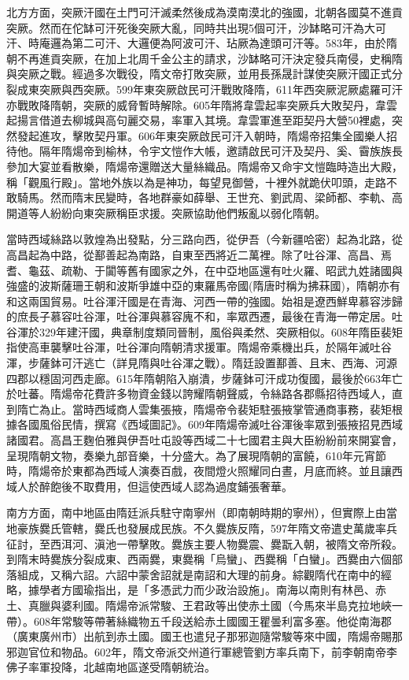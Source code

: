 北方方面，突厥汗國在土門可汗滅柔然後成為漠南漠北的強國，北朝各國莫不進貢突厥。然而在佗缽可汗死後突厥大亂，同時共出現5個可汗，沙缽略可汗為大可汗、時庵邏為第二可汗、大邏便為阿波可汗、玷厥為達頭可汗等。583年，由於隋朝不再進貢突厥，在加上北周千金公主的請求，沙缽略可汗決定發兵南侵，史稱隋與突厥之戰。經過多次戰役，隋文帝打敗突厥，並用長孫晟計謀使突厥汗國正式分裂成東突厥與西突厥。599年東突厥啟民可汗戰敗降隋，611年西突厥泥厥處羅可汗亦戰敗降隋朝，突厥的威脅暫時解除。605年隋將韋雲起率突厥兵大敗契丹，韋雲起揚言借道去柳城與高句麗交易，率軍入其境。韋雲軍進至距契丹大營50裡處，突然發起進攻，擊敗契丹軍。606年東突厥啟民可汗入朝時，隋煬帝招集全國樂人招待他。隔年隋煬帝到榆林，令宇文愷作大帳，邀請啟民可汗及契丹、奚、霫族族長參加大宴並看散樂，隋煬帝還贈送大量絲織品。隋煬帝又命宇文愷臨時造出大殿，稱「觀風行殿」。當地外族以為是神功，每望見御營，十裡外就跪伏叩頭，走路不敢騎馬。然而隋末民變時，各地群豪如薛舉、王世充、劉武周、梁師都、李軌、高開道等人紛紛向東突厥稱臣求援。突厥協助他們叛亂以弱化隋朝。

當時西域絲路以敦煌為出發點，分三路向西，從伊吾（今新疆哈密）起為北路，從高昌起為中路，從鄯善起為南路，自東至西將近二萬裡。除了吐谷渾、高昌、焉耆、龜茲、疏勒、于闐等舊有國家之外，在中亞地區還有吐火羅、昭武九姓諸國與強盛的波斯薩珊王朝和波斯爭雄中亞的東羅馬帝國(隋唐时稱为拂菻國)，隋朝亦有和这兩国貿易。吐谷渾汗國是在青海、河西一帶的強國。始祖是遼西鮮卑慕容涉歸的庶長子慕容吐谷渾，吐谷渾與慕容廆不和，率眾西遷，最後在青海一帶定居。吐谷渾於329年建汗國，典章制度類同晉制，風俗與柔然、突厥相似。608年隋臣裴矩指使高車襲擊吐谷渾，吐谷渾向隋朝清求援軍。隋煬帝乘機出兵，於隔年滅吐谷渾，步薩鉢可汗逃亡（詳見隋與吐谷渾之戰）。隋廷設置鄯善、且末、西海、河源四郡以穩固河西走廊。615年隋朝陷入崩潰，步薩鉢可汗成功復國，最後於663年亡於吐蕃。隋煬帝花費許多物資金錢以誇耀隋朝聲威，令絲路各郡縣招待西域人，直到隋亡為止。當時西域商人雲集張掖，隋煬帝令裴矩駐張掖掌管通商事務，裴矩根據各國風俗民情，撰寫《西域圖記》。609年隋煬帝滅吐谷渾後率眾到張掖招見西域諸國君。高昌王麴伯雅與伊吾吐屯設等西域二十七國君主與大臣紛紛前來開宴會，呈現隋朝文物，奏樂九部音樂，十分盛大。為了展現隋朝的富饒，610年元宵節時，隋煬帝於東都為西域人演奏百戲，夜間燈火照耀同白晝，月底而終。並且讓西域人於醉飽後不取費用，但這使西域人認為過度鋪張奢華。

南方方面，南中地區由隋廷派兵駐守南寧州（即南朝時期的寧州），但實際上由當地豪族爨氏管轄，爨氏也發展成民族。不久爨族反隋，597年隋文帝遣史萬歲率兵征討，至西洱河、滇池一帶擊敗。爨族主要人物爨震、爨翫入朝，被隋文帝所殺。到隋末時爨族分裂成東、西兩爨，東爨稱「烏蠻」、西爨稱「白蠻」。西爨由六個部落組成，又稱六詔。六詔中蒙舍詔就是南詔和大理的前身。綜觀隋代在南中的經略，據學者方國瑜指出，是「多憑武力而少政治設施」。南海以南則有林邑、赤土、真臘與婆利國。隋煬帝派常駿、王君政等出使赤土國（今馬來半島克拉地峽一帶）。608年常駿等帶著絲織物五千段送給赤土國國王瞿曇利富多塞。他從南海郡（廣東廣州市）出航到赤土國。國王也遣兒子那邪迦隨常駿等來中國，隋煬帝賜那邪迦官位和物品。602年，隋文帝派交州道行軍總管劉方率兵南下，前李朝南帝李佛子率軍投降，北越南地區遂受隋朝統治。

